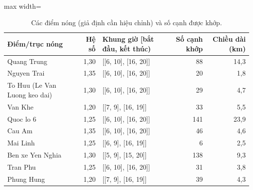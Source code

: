 \begin{table}[!htbp]
\centering
\small
\caption{Các điểm nóng (giả định cần hiệu chỉnh) và số cạnh được khớp.}
\label{tab:tab_hotspots}
\begin{adjustbox}{max width=\linewidth}
\begin{tabular}{lrlrr}
\toprule
Điểm/trục nóng & Hệ số & Khung giờ [bắt đầu, kết thúc) & Số cạnh khớp & Chiều dài (km) \\
\midrule
Quang Trung & 1{,}30 & [[6, 10], [16, 20]] & 88 & 14{,}3 \\
Nguyen Trai & 1{,}35 & [[6, 10], [16, 20]] & 20 & 1{,}8 \\
To Huu (Le Van Luong keo dai) & 1{,}30 & [[6, 10], [16, 20]] & 29 & 4{,}7 \\
Van Khe & 1{,}20 & [[7, 9], [16, 19]] & 33 & 5{,}5 \\
Quoc lo 6 & 1{,}25 & [[6, 10], [16, 20]] & 141 & 23{,}9 \\
Cau Am & 1{,}35 & [[6, 10], [16, 20]] & 46 & 4{,}6 \\
Mai Linh & 1{,}25 & [[6, 9], [16, 19]] & 6 & 2{,}5 \\
Ben xe Yen Nghia & 1{,}30 & [[5, 9], [15, 20]] & 138 & 9{,}3 \\
Tran Phu & 1{,}25 & [[6, 10], [16, 20]] & 31 & 3{,}8 \\
Phung Hung & 1{,}20 & [[7, 9], [16, 19]] & 39 & 4{,}3 \\
\bottomrule
\end{tabular}
\end{adjustbox}
\end{table}
